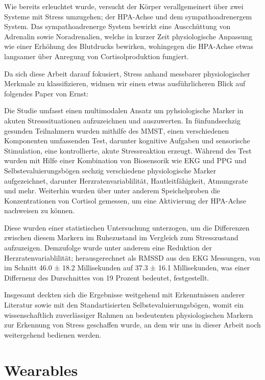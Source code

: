 Wie bereits erleuchtet wurde, versucht der Körper verallgemeinert über zwei Systeme mit Stress umzugehen; der \ac{HPA-Achse} und dem sympathoadrenergem System. 
Das sympathoadrenerge System bewirkt eine Auscchüttung von Adrenalin sowie Noradrenalien, welche in kurzer Zeit physiologische Anpassung wie einer Erhöhung des Blutdrucks bewirken,
wohingegen die \ac{HPA-Achse} etwas langsamer über Anregung von Cortisolproduktion fungiert. \cite{Kaiser2023}

Da sich diese Arbeit darauf fokusiert, Stress anhand messbarer physiologischer Merkmale zu klassifizieren, widmen wir einen etwas ausführlicheren Blick auf folgendes Paper von Ernst:

Die Studie umfasst einen multimodalen Ansatz um pyhsiologische Marker in akuten Stresssituationen aufzuzeichnen und auszuwerten. In fünfundsechzig gesunden Teilnahmern wurden mithilfe des 
\ac{MMST}, einen verschiedenen Komponenten umfassenden Test, darunter kognitive Aufgaben und sensorische Stimulation, eine kontrollierte, akute Stressreaktion erzeugt. Während des Test wurden mit 
Hilfe einer Kombination von Biosensorik wie \ac{EKG} und \ac{PPG} und Selbstevaluierungsbögen sechzig verschiedene physiologische Marker aufgezeichnet, darunter Herzratenvariablilität, Hautleitfähigkeit, Atmungsrate und mehr.
Weiterhin wurden über unter anderem Speichelproben die Konzentrationen von Cortisol gemessen, um eine Aktivierung der \ac{HPA-Achse} nachweisen zu können. 

Diese wurden einer statistischen Untersuchung unterzogen, um die Differenzen zwischen diesem Markern im Ruhezustand im Vergleich zum Stresszustand aufzuzeigen. Demzufolge wurde unter anderem eine Reduktion der Herzratenvariablilität; 
herausgerechnet als \ac{RMSSD} aus den \ac{EKG} Messungen, von im Schnitt 46.0 ± 18.2 Millisekunden auf 37.3 ± 16.1 Millisekunden, was einer Differnenz des Durschnittes 
von 19 Prozent bedeutet, festgestellt. \cite{Ernst2023}

Insgesamt deckten sich die Ergebnisse weitgehend mit Erkenntnissen anderer Literatur sowie mit den Standartisierten Selbstevaluierungsbögen, womit ein wissenschaftlich zuverlässiger Rahmen an bedeutenten physiologischen Markern
zur Erkennung von Stress geschaffen wurde, an dem wir uns in dieser Arbeit noch weitergehend bedienen werden.


\section{Wearables}

